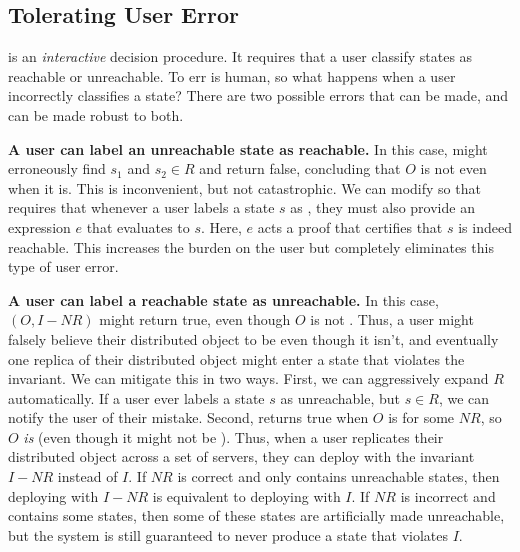 \begin{techreport}
  \subsection{Tolerating User Error}
   is an \emph{interactive} decision
  procedure. It requires that a user classify states as reachable or
  unreachable.  To err is human, so what happens when a user incorrectly
  classifies a state?  There are two possible errors that can be made, and
   can be made robust to both.

  \textbf{A user can label an unreachable state as reachable.}
  In this case, \Helper{} might erroneously find $s_1$ and $s_2 \in R$ and
  return false, concluding that $O$ is not \sTIconfluent{} even when it is.
  This is inconvenient, but not catastrophic. We can modify
   so that \Helper{} requires that
  whenever a user labels a state $s$ as \sTIreachable{}, they must also provide
  an \sTIreachable{} expression $e$ that evaluates to $s$. Here, $e$ acts a
  proof that certifies that $s$ is indeed reachable. This increases the burden
  on the user but completely eliminates this type of user error.

  \textbf{A user can label a reachable state as unreachable.}
  In this case, \IsIclosed$(O, I - NR)$ might return true, even though $O$ is
  not \sTIconfluent. Thus, a user might falsely believe their distributed
  object to be \sTIconfluent{} even though it isn't, and eventually one replica
  of their distributed object might enter a state that violates the invariant.
  We can mitigate this in two ways. First, we can aggressively expand $R$
  automatically. If a user ever labels a state $s$ as unreachable, but $s \in
  R$, we can notify the user of their mistake. Second, \Helper{} returns true
  when $O$ is  for some $NR$, so $O$ \emph{is}
   (even though it might not be \sTIconfluent{}).
  Thus, when a user replicates their distributed object across a set of
  servers, they can deploy with the invariant $I - NR$ instead of $I$. If $NR$
  is correct and only contains unreachable states, then deploying with $I - NR$
  is equivalent to deploying with $I$. If $NR$ is incorrect and contains some
  \sTIreachable{} states, then some of these states are artificially made
  unreachable, but the system is still guaranteed to never produce a state
  that violates $I$.
\end{techreport}

